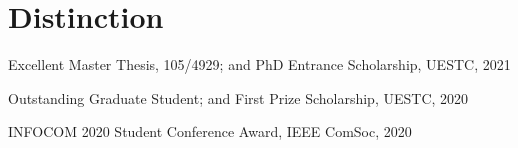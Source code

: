 \vspace{-8pt}
\section*{Distinction}
\vspace{-4pt}
\indent



Excellent Master Thesis, 105/4929; and PhD Entrance Scholarship, UESTC, 2021

Outstanding Graduate Student; and First Prize Scholarship, UESTC, 2020

INFOCOM 2020 Student Conference Award, IEEE ComSoc, 2020

